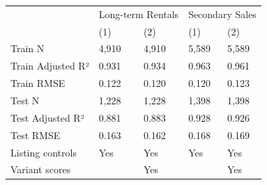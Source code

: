 \begin{tabular}{lllll}
\toprule
 & \multicolumn{2}{r}{Long-term Rentals} & \multicolumn{2}{r}{Secondary Sales} \\
 & (1) & (2) & (1) & (2) \\
\midrule
Train N & 4,910 & 4,910 & 5,589 & 5,589 \\
Train Adjusted R² & 0.931 & 0.934 & 0.963 & 0.961 \\
Train RMSE & 0.122 & 0.120 & 0.120 & 0.123 \\
Test N & 1,228 & 1,228 & 1,398 & 1,398 \\
Test Adjusted R² & 0.881 & 0.883 & 0.928 & 0.926 \\
Test RMSE & 0.163 & 0.162 & 0.168 & 0.169 \\
Listing controls & Yes & Yes & Yes & Yes \\
Variant scores &  & Yes &  & Yes \\
\bottomrule
\end{tabular}

